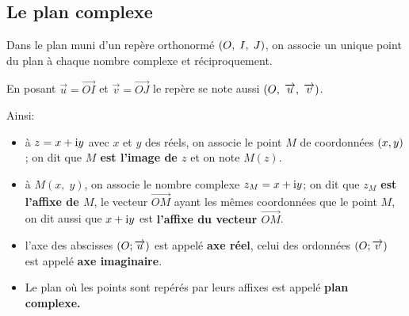 \subsection*{Le plan complexe}
Dans le plan muni d'un repère orthonormé   $ \left(O,\; I, \; J\right) $, on associe un unique point  du plan à chaque nombre complexe et réciproquement.

\medskip


  En posant  $  \overrightarrow{u}= \overrightarrow{OI}$  et $  \overrightarrow{v}= \overrightarrow{OJ}$  le repère se note aussi  $ \left(O,\; \overrightarrow{u}, \; \overrightarrow{v}\right) $.

\medskip
 Ainsi:
\begin{itemize}
\item à $ z=x+\text{i} y $  avec $x $ et $ y$ des réels, on associe le point $ M $  de coordonnées $ \left( x, y\right) $; on dit que \textbf{$  M$ est l'image de $ z $} et on note $ M(z) $.
\item à $ M(x,\; y )$, on associe le nombre complexe $ z_M=x+\text{i} y$; on dit que \textbf{$z_M$ est l'affixe  de $ M $}, le vecteur $ \overrightarrow{OM} $ ayant les mêmes coordonnées que le point $ M $, on dit aussi  que  $ x+\text{i} y$ est \textbf{l'affixe du vecteur  $ \overrightarrow{OM} $}.
\item l'axe des abscisses $ \left( O; \overrightarrow{u} \right)$  est appelé \textbf{ axe réel}, celui des ordonnées $ \left( O; \overrightarrow{v} \right)$ est appelé \textbf{axe imaginaire}.
\item Le plan où les points sont repérés par leurs affixes est appelé \textbf{plan complexe.}
\end{itemize}




